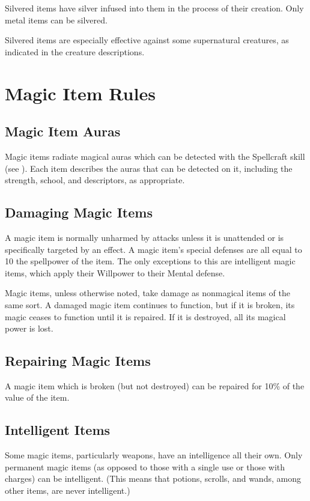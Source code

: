 
Silvered items have silver infused into them in the process of their creation.
Only metal items can be silvered.

Silvered items are especially effective against some supernatural creatures, as indicated in the creature descriptions.

\section{Magic Item Rules}

\subsection{Magic Item Auras}

Magic items radiate magical auras which can be detected with the Spellcraft skill (see ).
Each item describes the auras that can be detected on it, including the strength, school, and descriptors, as appropriate.

\subsection{Damaging Magic Items}

A magic item is normally unharmed by attacks unless it is unattended or is specifically targeted by an effect.
A magic item's special defenses are all equal to 10 \add the spellpower of the item.
The only exceptions to this are intelligent magic items, which apply their Willpower to their Mental defense.

Magic items, unless otherwise noted, take damage as nonmagical items of the same sort.
A damaged magic item continues to function, but if it is broken, its magic ceases to function until it is repaired.
If it is destroyed, all its magical power is lost.

\subsection{Repairing Magic Items}

A magic item which is broken (but not destroyed) can be repaired for 10\% of the value of the item.

\subsection{Intelligent Items}

Some magic items, particularly weapons, have an intelligence all their own.
Only permanent magic items (as opposed to those with a single use or those with charges) can be intelligent.
(This means that potions, scrolls, and wands, among other items, are never intelligent.)

